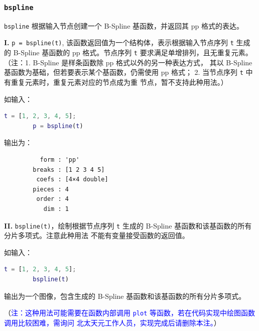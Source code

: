 \subsubsection{\texttt{bspline}}

\texttt{bspline} 根据输入节点创建一个 B-Spline 基函数，并返回其 pp 格式的表达。

\textbf{I.}  \texttt{p = bspline(t)}, 该函数返回值为一个结构体，表示根据输入节点序列 \texttt{t} 生成的 B-Spline 基函数的
pp 格式。节点序列 \texttt{t} 要求满足单增排列，且无重复元素。（{\kaishu 注：1. B-Spline 是样条函数除 pp 格式以外的另一种表达方式，
其以 B-Spline 基函数为基础，但若要表示某个基函数，仍需使用 pp 格式； 2. 当节点序列 \texttt{t} 中有重复元素时，重复元素对应的节点成为重
节点，暂不支持此种用法。}）

如输入：
\begin{lstlisting}[language=matlab]
        t = [1, 2, 3, 4, 5];
        p = bspline(t)
\end{lstlisting}

输出为：
\begin{lstlisting}
          form : 'pp'
        breaks : [1 2 3 4 5]
         coefs : [4×4 double]
        pieces : 4
         order : 4
           dim : 1
\end{lstlisting}

\textbf{II.} \texttt{bspline(t)}，绘制根据节点序列 \texttt{t} 生成的 B-Spline 基函数和该基函数的所有分片多项式。注意此种用法
不能有变量接受函数的返回值。

如输入：
\begin{lstlisting}[language=matlab]
        t = [1, 2, 3, 4, 5];
        bspline(t)
\end{lstlisting}

输出为一个图像，包含生成的 B-Spline 基函数和该基函数的所有分片多项式。

（{\kaishu \textcolor{blue}{注：这种用法可能需要在函数内部调用 \texttt{plot} 等函数，若在代码实现中绘图函数调用比较困难，需询问
    北太天元工作人员，实现完成后请删除本注。}}）
